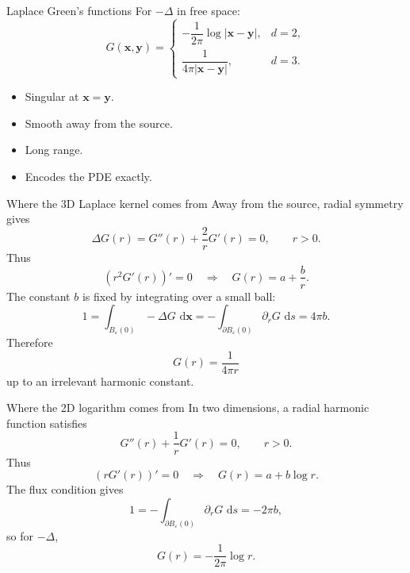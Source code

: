 \documentclass[aspectratio=169,11pt]{beamer}
\newcommand{\dd}{\,\mathrm d}
\newcommand{\x}{\bm{x}}
\newcommand{\y}{\bm{y}}
\newcommand{\eps}{\varepsilon}
\begin{document}
\begin{frame}{Laplace Green's functions}
\small
For $-\Delta$ in free space:
\[
  G(\x,\y)=
  \begin{cases}
  -\dfrac{1}{2\pi}\log|\x-\y|, & d=2,\\[1.0em]
  \dfrac{1}{4\pi|\x-\y|}, & d=3.
  \end{cases}
\]

\begin{itemize}
  \item Singular at $\x=\y$.
  \item Smooth away from the source.
  \item Long range.
  \item Encodes the PDE exactly.
\end{itemize}
\end{frame}

\begin{frame}{Where the 3D Laplace kernel comes from}
\small
Away from the source, radial symmetry gives
\[
\Delta G(r)=G''(r)+\frac{2}{r}G'(r)=0,\qquad r>0.
\]
Thus
\[
(r^2G'(r))'=0
\quad\Rightarrow\quad
G(r)=a+\frac{b}{r}.
\]
The constant $b$ is fixed by integrating over a small ball:
\[
1=\int_{B_\eps(0)}-\Delta G\,\dd\x
=-\int_{\partial B_\eps(0)}\partial_rG\,\dd s
=4\pi b.
\]
Therefore
\[
G(r)=\frac{1}{4\pi r}
\]
up to an irrelevant harmonic constant.
\end{frame}

\begin{frame}{Where the 2D logarithm comes from}
\small
In two dimensions, a radial harmonic function satisfies
\[
G''(r)+\frac{1}{r}G'(r)=0,
\qquad r>0.
\]
Thus
\[
(rG'(r))'=0
\quad\Rightarrow\quad
G(r)=a+b\log r.
\]
The flux condition gives
\[
1=-\int_{\partial B_\eps(0)}\partial_r G\,\dd s
=-2\pi b,
\]
so for $-\Delta$,
\[
G(r)=-\frac{1}{2\pi}\log r.
\]
\end{frame}
\end{document}
